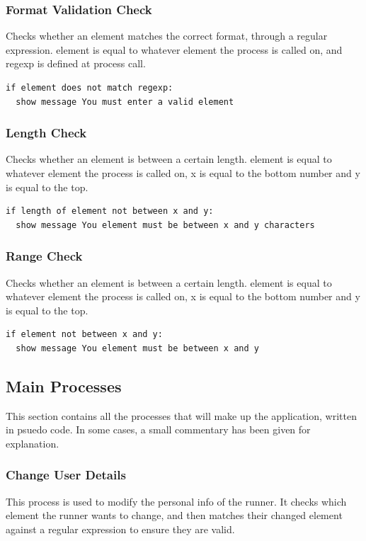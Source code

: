 \documentclass{article}[12pt,a4paper]
\begin{document}
\subsubsection{Format Validation Check}
Checks whether an element matches the correct format, through a regular expression. element is equal to whatever element the process is called on, and regexp is defined at process call.
\begin{verbatim}
if element does not match regexp:
  show message You must enter a valid element
\end{verbatim}

\subsubsection{Length Check}
Checks whether an element is between a certain length. element is equal to whatever element the process is called on, x is equal to the bottom number and y is equal to the top.
\begin{verbatim}
if length of element not between x and y:
  show message You element must be between x and y characters
\end{verbatim}

\subsubsection{Range Check}
Checks whether an element is between a certain length. element is equal to whatever element the process is called on, x is equal to the bottom number and y is equal to the top.
\begin{verbatim}
if element not between x and y:
  show message You element must be between x and y
\end{verbatim}


\subsection{Main Processes}
This section contains all the processes that will make up the application, written in psuedo code. In some cases, a small commentary has been given for explanation.

\subsubsection{Change User Details}
This process is used to modify the personal info of the runner. It checks which element the runner wants to change, and then matches their changed element against a regular expression to ensure they are valid. 
\end{document}
